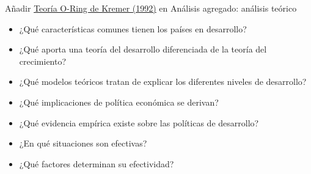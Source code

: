 \documentclass{nuevotema}
\begin{document}
\ideaclave

Añadir \href{https://scholar.google.es/scholar?hl=es&as_sdt=0\%2C5&q=The+O-Ring+Theory+of+Economic+Development&btnG=}{Teoría O-Ring de Kremer (1992)} en Análisis agregado: análisis teórico


\begin{itemize}
	\item ¿Qué características comunes tienen los países en desarrollo?
	\item ¿Qué aporta una teoría del desarrollo diferenciada de la teoría del crecimiento?
	\item ¿Qué modelos teóricos tratan de explicar los diferentes niveles de desarrollo?
	\item ¿Qué implicaciones de política económica se derivan?
	\item ¿Qué evidencia empírica existe sobre las políticas de desarrollo?
	\item ¿En qué situaciones son efectivas?
	\item ¿Qué factores determinan su efectividad?
\end{itemize}

\esquemacorto
\end{document}
